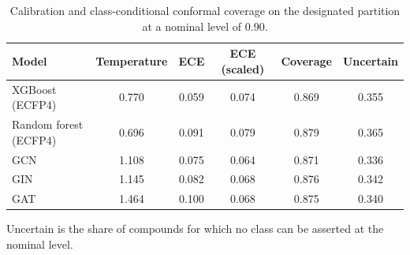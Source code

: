 \begin{table}[htbp]
\centering
\caption{Calibration and class-conditional conformal coverage on the designated partition at a nominal level of 0.90.}
\label{tab:calibration}
\footnotesize
\setlength{\tabcolsep}{4pt}
\begin{tabular}{lccccc}
\toprule
Model & Temperature & ECE & ECE (scaled) & Coverage & Uncertain \\
\midrule
XGBoost (ECFP4) & 0.770 & 0.059 & 0.074 & 0.869 & 0.355 \\
Random forest (ECFP4) & 0.696 & 0.091 & 0.079 & 0.879 & 0.365 \\
GCN & 1.108 & 0.075 & 0.064 & 0.871 & 0.336 \\
GIN & 1.145 & 0.082 & 0.068 & 0.876 & 0.342 \\
GAT & 1.464 & 0.100 & 0.068 & 0.875 & 0.340 \\
\bottomrule
\end{tabular}
\begin{flushleft}\footnotesize Uncertain is the share of compounds for which no class can be asserted at the nominal level.\end{flushleft}
\end{table}
